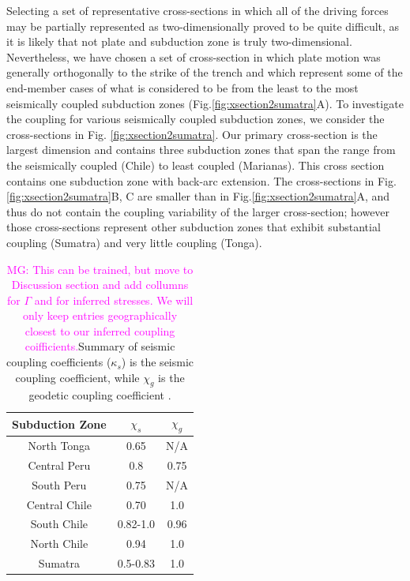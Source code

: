 \documentclass[12pt]{article}
\newcommand{\mgnote}[1]{\textcolor{magenta}{MG: #1}}
\begin{document}
Selecting a set of representative cross-sections in which all of the driving forces may be partially represented as two-dimensionally proved to be quite difficult, as it is likely that not plate and subduction zone is truly two-dimensional. 
Nevertheless, we have chosen a set of cross-section in which plate motion was generally orthogonally to the strike of the trench and which represent some of the end-member cases of what is considered to be from the least to the most seismically coupled subduction zones (Fig.\ref{fig:xsection2sumatra}A). To investigate the coupling for various seismically coupled subduction zones, we consider the cross-sections in Fig. \ref{fig:xsection2sumatra}. Our primary cross-section is the largest dimension and contains three subduction zones that span the range from the seismically coupled (Chile) to least coupled (Marianas). This cross section contains one subduction zone with back-arc extension. The cross-sections in Fig.\ref{fig:xsection2sumatra}B, C are smaller than in  Fig.\ref{fig:xsection2sumatra}A, and thus do not contain the coupling variability of the larger cross-section; however those cross-sections represent other subduction zones that exhibit substantial coupling (Sumatra) and very little coupling (Tonga).

\begin{table}[H]
  \caption{\mgnote{This can be trained, but move to Discussion section and add collumns for $\Gamma$ and for inferred stresses. We will only keep entries geographically closest to our inferred coupling coifficients.}Summary of seismic coupling coefficients ($\kappa_s$) is the seismic coupling coefficient, while $\chi_g$ is the geodetic coupling coefficient \citep{scholz2012seismic}.} %
  \centering  %
  \begin{tabular}{c c c} %
    \hline \hline                        %
    Subduction Zone & $\chi_s$ & $\chi_g$  \\ [0.5ex] %
    \hline                  %
    North Tonga  &0.65 &N/A   \\
    Central Peru &0.8 &0.75 \\
    South Peru &0.75 &N/A \\
    Central Chile &0.70 &1.0 \\
    South Chile  &0.82-1.0 &0.96 \\
    North Chile &0.94 &1.0 \\
    Sumatra &0.5-0.83 &1.0 \\
    \hline %
  \end{tabular}
  \label{table:parameters} %
\end{table}
\end{document}
